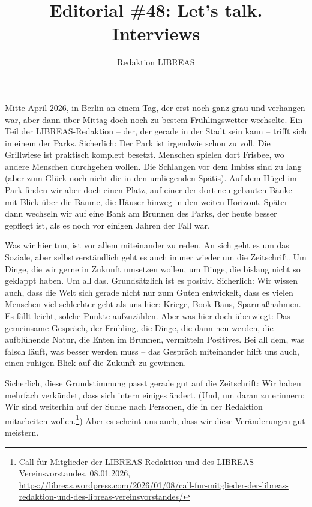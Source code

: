 \documentclass[a4paper,
fontsize=11pt,
oneside,
numbers=noperiodatend,
parskip=half-,
bibliography=totoc,
final
]{scrartcl}
\title{\LARGE{Editorial \#48: Let’s talk. Interviews}}%
\author{Redaktion LIBREAS} %
\date{}
\begin{document}
\maketitle
\thispagestyle{fancyplain} 


Mitte April 2026, in Berlin an einem Tag, der erst noch ganz grau und
verhangen war, aber dann über Mittag doch noch zu bestem Frühlingswetter
wechselte. Ein Teil der LIBREAS-Redaktion – der, der gerade in der Stadt
sein kann – trifft sich in einem der Parks. Sicherlich: Der Park ist
irgendwie schon zu voll. Die Grillwiese ist praktisch komplett besetzt.
Menschen spielen dort Frisbee, wo andere Menschen durchgehen wollen. Die
Schlangen vor dem Imbiss sind zu lang (aber zum Glück noch nicht die in
den umliegenden Spätis). Auf dem Hügel im Park finden wir aber doch
einen Platz, auf einer der dort neu gebauten Bänke mit Blick über die
Bäume, die Häuser hinweg in den weiten Horizont. Später dann wechseln
wir auf eine Bank am Brunnen des Parks, der heute besser gepflegt ist,
als es noch vor einigen Jahren der Fall war.

Was wir hier tun, ist vor allem miteinander zu reden. An sich geht es um
das Soziale, aber selbstverständlich geht es auch immer wieder um die
Zeitschrift. Um Dinge, die wir gerne in Zukunft umsetzen wollen, um
Dinge, die bislang nicht so geklappt haben. Um all das. Grundsätzlich
ist es positiv. Sicherlich: Wir wissen auch, dass die Welt sich gerade
nicht nur zum Guten entwickelt, dass es vielen Menschen viel schlechter
geht als uns hier: Kriege, Book Bans, Sparmaßnahmen. Es fällt leicht,
solche Punkte aufzuzählen. Aber was hier doch überwiegt: Das gemeinsame
Gespräch, der Frühling, die Dinge, die dann neu werden, die aufblühende
Natur, die Enten im Brunnen, vermitteln Positives. Bei all dem, was
falsch läuft, was besser werden muss – das Gespräch miteinander hilft
uns auch, einen ruhigen Blick auf die Zukunft zu gewinnen.

Sicherlich, diese Grundstimmung passt gerade gut auf die Zeitschrift:
Wir haben mehrfach verkündet, dass sich intern einiges ändert. (Und, um
daran zu erinnern: Wir sind weiterhin auf der Suche nach Personen, die
in der Redaktion mitarbeiten wollen.\footnote{Call für Mitglieder der
  LIBREAS-Redaktion und des LIBREAS-Vereinsvorstandes, 08.01.2026,
  \url{https://libreas.wordpress.com/2026/01/08/call-fur-mitglieder-der-libreas-redaktion-und-des-libreas-vereinsvorstandes/}})
Aber es scheint uns auch, dass wir diese Veränderungen gut meistern.
\end{document}
